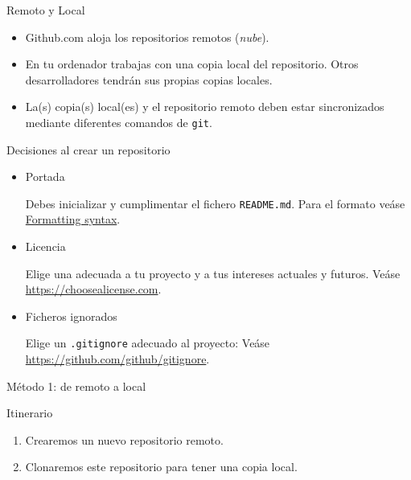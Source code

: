 \documentclass[aspectratio=169, xcolor={usenames,svgnames,dvipsnames}]{beamer}
\begin{document}
\begin{frame}[label={sec:org0d84d84},fragile]{Remoto y Local}
 \begin{itemize}
\item \alert{Github.com} aloja los \alert{repositorios remotos} (\emph{nube}).
\item En tu ordenador trabajas con una \alert{copia local} del repositorio. Otros desarrolladores tendrán sus propias copias locales.
\item La(s) copia(s) local(es) y el repositorio remoto deben estar \alert{sincronizados} mediante diferentes comandos de \texttt{git}.
\end{itemize}
\end{frame}
\begin{frame}[label={sec:orga609c9b},fragile]{Decisiones al crear un repositorio}
 \begin{itemize}
\item \alert{Portada}

Debes inicializar y cumplimentar el fichero \alert{\texttt{README.md}}. Para el formato veáse \href{https://help.github.com/articles/basic-writing-and-formatting-syntax/}{Formatting syntax}.

\item \alert{Licencia}

Elige una adecuada a tu proyecto y a tus intereses actuales y futuros. Veáse \url{https://choosealicense.com}.

\item \alert{Ficheros ignorados}

Elige un \alert{\texttt{.gitignore}} adecuado al proyecto: Veáse \url{https://github.com/github/gitignore}.
\end{itemize}
\end{frame}

\begin{frame}[label={sec:org2f19c7a}]{Método 1: de remoto a local}
\begin{block}{Itinerario}
\begin{enumerate}
\item Crearemos un nuevo repositorio \alert{remoto}.
\item Clonaremos este repositorio para tener una copia local.
\end{enumerate}
\end{block}
\end{frame}
\end{document}
